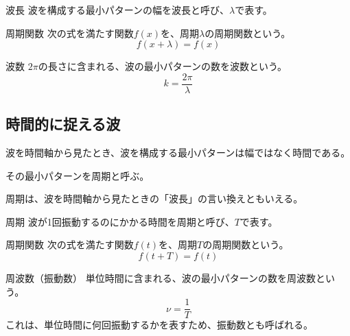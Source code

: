 \documentclass[16pt,b5paper]{book}
\begin{document}
\begin{definition}{波長}
  波を構成する最小パターンの幅を波長と呼び、$\lambda$で表す。
\end{definition}

\begin{definition}{周期関数}
  次の式を満たす関数$f(x)$を、周期$\lambda$の周期関数という。
  \LARGE
  \begin{equation}
    f(x+\lambda) = f(x)
  \end{equation}
\end{definition}

\begin{definition}{波数}
  $2\pi$の長さに含まれる、波の最小パターンの数を波数という。
  \LARGE
  \begin{equation}
    k = \dfrac{2\pi}{\lambda}
  \end{equation}
\end{definition}

\subsection{時間的に捉える波}

波を時間軸から見たとき、波を構成する最小パターンは幅ではなく時間である。

その最小パターンを周期と呼ぶ。

周期は、波を時間軸から見たときの「波長」の言い換えともいえる。

\begin{definition}{周期}
  波が1回振動するのにかかる時間を周期と呼び、$T$で表す。
\end{definition}

\begin{definition}{周期関数}
  次の式を満たす関数$f(t)$を、周期$T$の周期関数という。
  \LARGE
  \begin{equation}
    f(t+T) = f(t)
  \end{equation}
\end{definition}

\begin{definition}{周波数（振動数）}
  \newline
  単位時間に含まれる、波の最小パターンの数を周波数という。
  \LARGE
  \begin{equation}
    \nu = \dfrac{1}{T}
  \end{equation}
  \normalsize
  これは、単位時間に何回振動するかを表すため、振動数とも呼ばれる。
\end{definition}
\end{document}
